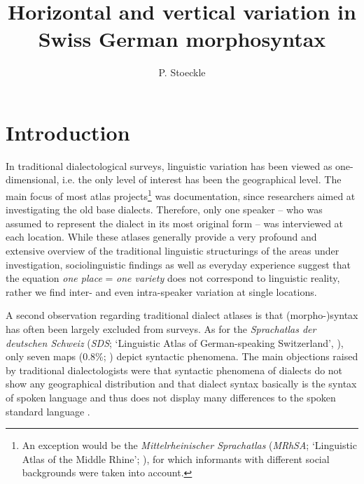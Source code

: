 \documentclass[output=paper]{LSP/langsci}
\author{P. Stoeckle}
\title{Horizontal and vertical variation in Swiss German morphosyntax}
\begin{document}
 
   

\section{Introduction}
In traditional dialectological surveys, linguistic variation has been viewed as one-dimensional, i.e. the only level of interest has been the geographical level. The main focus of most atlas projects\footnote{ An exception would be the \emph{Mittelrheinischer Sprachatlas} (\emph{MRhSA}; ‘Linguistic Atlas of the Middle Rhine’; \citealt{bellmann_mittelrheinischer_1994}), for which informants with different social backgrounds were taken into account.} was documentation, since researchers aimed at investigating the old base dialects. Therefore, only one speaker – who was assumed to represent the dialect in its most original form – was interviewed at each location. While these atlases generally provide a very profound and extensive overview of the traditional linguistic structurings of the areas under investigation, sociolinguistic findings as well as everyday experience suggest that the equation \emph{one place} = \emph{one variety} does not correspond to linguistic reality, rather we find inter- and even intra-speaker variation at single locations.

A second observation regarding traditional dialect atlases is that (morpho-)syntax has often been largely excluded from surveys. As for the \emph{Sprachatlas der deutschen Schweiz} (\emph{SDS}; ‘Linguistic Atlas of German-speaking Switzerland’, \cite{hotzenkocherle_sprachatlas_1962}), only seven maps (0.8\%; \citealt[42]{bucheli_syntactic_2002}) depict syntactic phenomena. The main objections raised by traditional dialectologists were that syntactic phenomena of dialects do not show any geographical distribution and that dialect syntax basically is the syntax of spoken language and thus does not display many differences to the spoken standard language \citep[109]{loffler_dialektologie._2003}.
\end{document}
